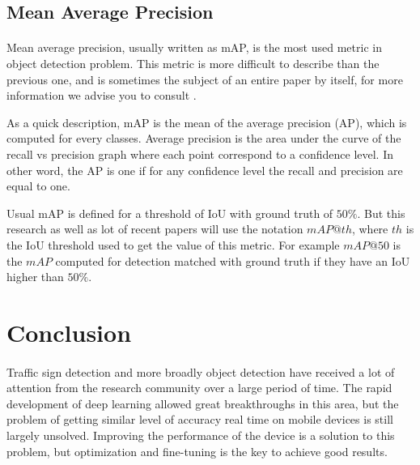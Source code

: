 \subsection{Mean Average Precision}
\paragraph{}
Mean average precision, usually written as mAP, is the most used metric in object detection problem. This metric is more difficult to describe than the previous one, and is sometimes the subject of an entire paper by itself, for more information we advise you to consult \cite{wiki:metrics}.

As a quick description, mAP is the mean of the average precision (AP), which is computed for every classes. Average precision is the area under the curve of the recall vs precision graph where each point correspond to a confidence level. In other word, the AP is one if for any confidence level the recall and precision are equal to one.

Usual mAP is defined for a threshold of IoU with ground truth of $50\%$. But this research as well as lot of recent papers will use the notation $mAP@th$, where $th$ is the IoU threshold used to get the value of this metric. For example $mAP@50$ is the $mAP$ computed for detection matched with ground truth if they have an IoU higher than $50\%$.

\section{Conclusion}
\paragraph{}
Traffic sign detection and more broadly object detection have received a lot of attention from the research community over a large period of time. The rapid development of deep learning allowed great breakthroughs in this area, but the problem of getting similar level of accuracy real time on mobile devices is still largely unsolved. Improving the performance of the device is a solution to this problem, but optimization and fine-tuning is the key to achieve good results.

